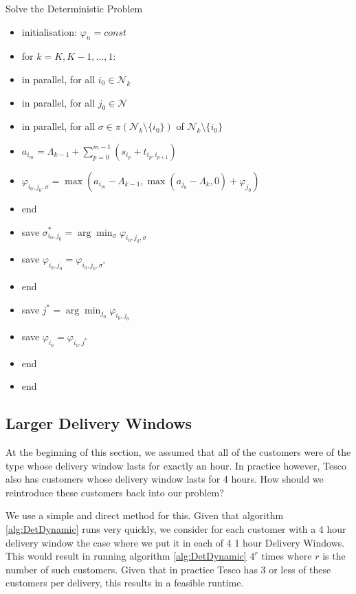 \begin{algorithm}{Solve the Deterministic Problem}{}
	\label{alg:DetDynamic}
	\begin{itemize}
		\item[] initialisation: $\varphi_n = const$
		\item[] for $k=K, K-1, \ldots, 1:$
		\item[] \quad in parallel, for all $i_0\in{\mathcal N}_k$
		\item[] \quad\quad in parallel, for all $j_0\in{\mathcal N}$
		\item[] \quad\quad\quad in parallel, for all $\sigma\in\pi(\mathcal{N}_k \setminus\{i_0\})$ of ${\mathcal N}_k\setminus\{i_0\}$
		\item[] \quad\quad\quad\quad $a_{i_m}=\Lambda_{k-1}+\sum_{p=0}^{m-1}\left(s_{i_p}+t_{i_{p},i_{p+1}}\right)$
		\item[] \quad\quad\quad\quad $\varphi_{i_0,j_0,\sigma}=\max(a_{i_m}-\Lambda_{k-1}, \max(a_{j_0} - \Lambda_k,0) + \varphi_{j_0})$
		\item[] \quad\quad\quad end
		\item[] \quad\quad\quad save $\sigma^*_{i_0,j_0}=\arg\min_{\sigma}\varphi_{i_0,j_0,\sigma}$
		\item[] \quad\quad\quad save $\varphi_{i_0,j_0}=\varphi_{i_0,j_0,\sigma^*}$
		\item[] \quad\quad end
		\item[] \quad save $j^* = \arg\min_{j_0} \varphi_{i_0,j_0}$
		\item[] \quad save $\varphi_{i_0} = \varphi_{i_0, j^*}$
		\item[] \quad end
		\item[] end
	\end{itemize}
\end{algorithm}

\subsection{Larger Delivery Windows}
\label{sec:quick_fix}
At the beginning of this section, we assumed that all of the customers were of the type whose delivery window lasts for exactly an hour. In practice however, Tesco also has customers whose delivery window lasts for 4 hours. How should we reintroduce these customers back into our problem?

We use a simple and direct method for this. Given that algorithm \ref{alg:DetDynamic} runs very quickly, we consider for each customer with a 4 hour delivery window the case where we put it in each of 4 1 hour Delivery Windows. This would result in running algorithm \ref{alg:DetDynamic} $4^r$ times where $r$ is the number of such customers. Given that in practice Tesco has 3 or less of these customers per delivery, this results in a feasible runtime.

